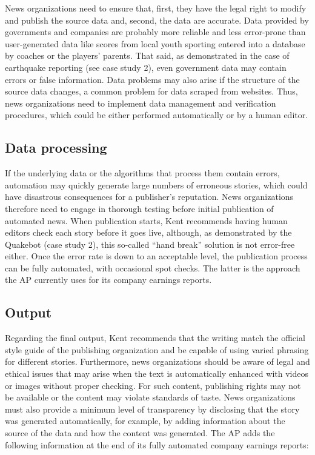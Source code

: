 \documentclass[notoc, symmetric, nobib, nols]{towcenter-book}
\begin{document}
News organizations need to ensure that, first, they have the legal right to modify and publish the source data and, second, the data are accurate. Data provided by governments and companies are probably more reliable and less error-prone than user-generated data like scores from local youth sporting entered into a database by coaches or the players’ parents. That said, as demonstrated in the case of earthquake reporting (see case study 2), even government data may contain errors or false information. Data problems may also arise if the structure of the source data changes, a common problem for data scraped from websites. Thus, news organizations need to implement data management and verification procedures, which could be either performed automatically or by a human editor.

\subsection{Data processing}

If the underlying data or the algorithms that process them contain errors, automation may quickly generate large numbers of erroneous stories, which could have disastrous consequences for a publisher’s reputation. News organizations therefore need to engage in thorough testing before initial publication of automated news. When publication starts, Kent recommends having human editors check each story before it goes live, although, as demonstrated by the Quakebot (case study 2), this so-called ``hand break'' solution is not error-free either. Once the error rate is down to an acceptable level, the publication process can be fully automated, with occasional spot checks. The latter is the approach the AP currently uses for its company earnings reports.

\subsection{Output} 

Regarding the final output, Kent recommends that the writing match the official style guide of the publishing organization and be capable of using varied phrasing for different stories. Furthermore, news organizations should be aware of legal and ethical issues that may arise when the text is automatically enhanced with videos or images without proper checking. For such content, publishing rights may not be available or the content may violate standards of taste. News organizations must also provide a minimum level of transparency by disclosing that the story was generated automatically, for example, by adding information about the source of the data and how the content was generated. The AP adds the following information at the end of its fully automated company earnings reports:
 
\end{document}
